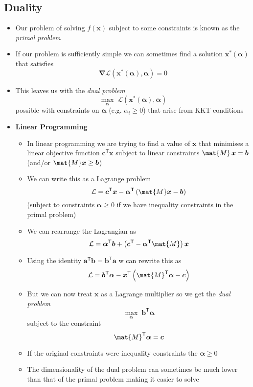 \documentclass[11pt]{article}
\newcommand{\tr}{\textsf{T}}
\newcommand{\grad}{\bm{\nabla}}
\begin{document}
\subsection{Duality}
\label{sec:orgf3478b2}
\begin{itemize}
\item Our problem of solving \(f(\bm{x})\) subject to some constraints is
known as the \emph{primal problem}
\item If our problem is sufficiently simple we can sometimes find a
solution \(\bm{x}^*(\bm{\alpha})\) that satisfies
$$ \grad  \mathcal{L}(\bm{x}^*(\bm{\alpha}),\bm{\alpha}) = 0 $$
\item This leaves us with the \emph{dual problem}
$$ \max_{\bm{\alpha}} \;
     \mathcal{L}(\bm{x}^*(\bm{\alpha}),\bm{\alpha}) $$
possible with constraints on \(\bm{\alpha}\) (e.g. \(\alpha_i\geq0\))
that arise from KKT conditions
\item \textbf{Linear Programming}
\begin{itemize}
\item In linear programming we are trying to find a value of \(\bm{x}\)
that minimises a linear objective function \(\bm{c}^\tr\bm{x}\)
subject to linear constraints \(\mat{M}\,\bm{x} = \bm{b}\)
(and/or \(\mat{M}\bm{x}\geq \bm{b}\))
\item We can write this as a Lagrange problem
$$ \mathcal{L} = \bm{c}^\tr \bm{x}  - \bm{\alpha}^\tr \left(
       \mat{M}\bm{x} - \bm{b}\right) $$
(subject to constraints \(\bm{\alpha}\geq0\) if we have
inequality constraints in the primal problem)
\item We can rearrange the Lagrangian as
$$ \mathcal{L} = \bm{\alpha}^\tr  \bm{b} + \left( \bm{c}^\tr - \bm{\alpha}^\tr \mat{M} \right) \bm{x} $$
\item Using the identity \(\bm{a}^\tr\bm{b} = \bm{b}^\tr \bm{a}\) w can rewrite this
as
$$ \mathcal{L} =  \bm{b}^\tr \bm{\alpha} - \bm{x}^\tr \left(\mat{M}^\tr \bm{\alpha} - \bm{c} \right) $$
\item But we can now treat \(\bm{x}\) as a Lagrange multiplier so we
get the \emph{dual problem}
$$ \max_{\bm{\alpha}} \; \bm{b}^\tr \bm{\alpha} $$
subject to the constraint
$$ \mat{M}^\tr \bm{\alpha} =  \bm{c} $$
\item If the original constraints were inequality constraints the \(\bm{\alpha}\geq0\)
\item The dimensionality of the dual problem can sometimes be much
lower than that of the primal problem making it easier to solve
\end{itemize}

\end{itemize}
\end{document}
